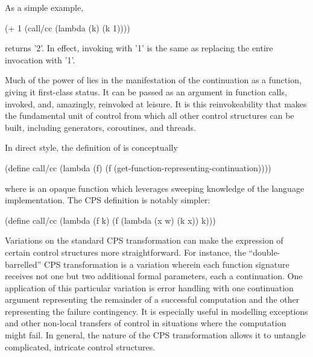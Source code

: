 As a simple example,
\begin{schemedisplay}
(+ 1 (call/cc
       (lambda (k)
         (k 1))))
\end{schemedisplay}
returns \scheme'2'. In effect, invoking  with \scheme'1' is the same 
as replacing the entire  invocation with \scheme'1'.

Much of the power of  lies in the manifestation of the continuation as a
function, giving it first-class status. It can be passed as an argument in function calls,
invoked, and, amazingly, reinvoked at leisure. It is this reinvokeability that makes
 the fundamental unit of control from which all other control structures can
be built, including generators, coroutines, and threads.


In direct style, the definition of  is conceptually 
\begin{schemedisplay}
(define call/cc
  (lambda (f)
    (f (get-function-representing-continuation))))
\end{schemedisplay}
where  is an opaque function which leverages
sweeping knowledge of the language implementation. The CPS definition is notably simpler:
\begin{schemedisplay}
(define call/cc
  (lambda (f k)
    (f (lambda (x w) (k x)) k)))
\end{schemedisplay}

Variations on the standard CPS transformation can make the expression of certain control
structures more straightforward. For instance, the ``double-barrelled'' CPS transformation
is a variation wherein each function signature receives not one but two additional formal
parameters, each a continuation. One application of this particular variation is error
handling with one continuation argument representing the remainder of a successful
computation and the other representing the failure contingency. It is especially useful in
modelling exceptions and other non-local transfers of control in situations where the
computation might fail. In general, the nature of the CPS transformation allows it to
untangle complicated, intricate control structures.

